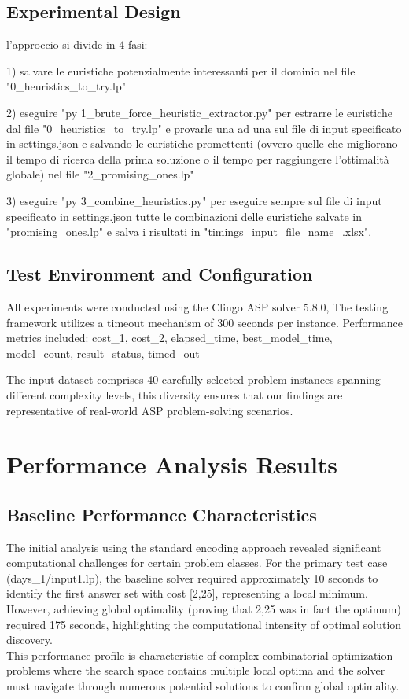 \documentclass[11pt,a4paper]{article}
\begin{document}
\subsection{Experimental Design}

l'approccio si divide in 4 fasi:

1) salvare le euristiche potenzialmente interessanti per il dominio nel file "0_heuristics_to_try.lp"

2) eseguire "py 1_brute_force_heuristic_extractor.py" per estrarre le euristiche dal file "0_heuristics_to_try.lp" e provarle una ad una sul file di input specificato in settings.json e salvando le euristiche promettenti (ovvero quelle che migliorano il tempo di ricerca della prima soluzione o il tempo per raggiungere l'ottimalità globale) nel file "2_promising_ones.lp"

3) eseguire "py 3_combine_heuristics.py" per eseguire sempre sul file di input specificato in settings.json tutte le combinazioni delle euristiche salvate in "promising_ones.lp" e salva i risultati in "timings_{input_file_name}_.xlsx".

\subsection{Test Environment and Configuration}

All experiments were conducted using the Clingo ASP solver 5.8.0,
The testing framework utilizes a timeout mechanism of 300 seconds per instance.
Performance metrics included:
cost_1, cost_2, elapsed_time, best_model_time, model_count, result_status, timed_out

The input dataset comprises 40 carefully selected problem instances spanning different complexity levels, this diversity ensures that our findings are representative of real-world ASP problem-solving scenarios.

\section{Performance Analysis Results}

\subsection{Baseline Performance Characteristics}

The initial analysis using the standard encoding approach revealed significant computational challenges for certain problem classes.
For the primary test case (days_1/input1.lp), the baseline solver required approximately 10 seconds to identify the first answer set with cost [2,25], representing a local minimum.
However, achieving global optimality (proving that 2,25 was in fact the optimum) required 175 seconds, highlighting the computational intensity of optimal solution discovery.\\
This performance profile is characteristic of complex combinatorial optimization problems where the search space contains multiple local optima and the solver must navigate through numerous potential solutions to confirm global optimality.
\end{document}
